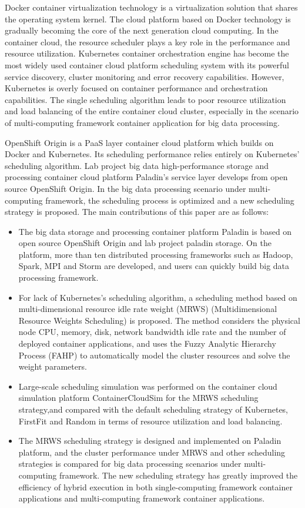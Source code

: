 \begin{eabstract}
Docker container virtualization technology is a virtualization solution that shares the operating system kernel. The cloud platform based on Docker technology is gradually becoming the core of the next generation cloud computing. In the container cloud, the resource scheduler plays a key role in the performance and resource utilization. Kubernetes container orchestration engine has become the most widely used container cloud platform scheduling system with its powerful service discovery, cluster monitoring and error recovery capabilities. However, Kubernetes is overly focused on container performance and orchestration capabilities. The single scheduling algorithm leads to poor resource utilization and load balancing of the entire container cloud cluster, especially in the scenario of multi-computing framework container application for big data processing.

OpenShift Origin is a PaaS layer container cloud platform which builds on Docker and Kubernetes. Its scheduling performance relies entirely on Kubernetes' scheduling algorithm. Lab project big data high-performance storage and processing container cloud platform Paladin's service layer develops from open source OpenShift Origin. In the big data processing scenario under multi-computing framework, the scheduling process is optimized and a new scheduling strategy is proposed. The main contributions of this paper are as follows:
\begin{itemize}
	\item The big data storage and processing container platform Paladin is based on open source OpenShift Origin and lab project paladin storage. On the platform, more than ten distributed processing frameworks such as Hadoop, Spark, MPI and Storm are developed, and users can quickly build big data processing framework.
	\item For lack of Kubernetes's scheduling algorithm, a scheduling method based on multi-dimensional resource idle rate weight (MRWS) (Multidimensional Resource Weights Scheduling) is proposed. The method considers the physical node CPU, memory, disk, network bandwidth idle rate and the number of deployed container applications, and uses the Fuzzy Analytic Hierarchy Process (FAHP) to automatically model the cluster resources and solve the weight parameters. 
	\item Large-scale scheduling simulation was performed on the container cloud simulation platform ContainerCloudSim for the MRWS scheduling strategy,and compared with the default scheduling strategy of Kubernetes, FirstFit and Random in terms of resource utilization and load balancing.
	\item The MRWS scheduling strategy is designed and implemented on Paladin platform, and the cluster performance under MRWS and other scheduling strategies is compared for big data processing scenarios under multi-computing framework. The new scheduling strategy has greatly improved the efficiency of hybrid execution in both single-computing framework container applications and multi-computing framework container applications.
\end{itemize}
  

\end{eabstract}
